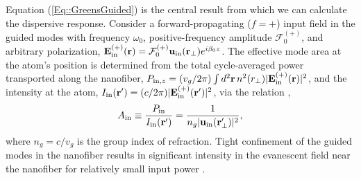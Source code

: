 \documentclass[preprint, aps,pra,onecolumn]{revtex4-1} %
\newcommand{\inp}{{\rm in}}
\newcommand{\Eamp}{\mathcal{F}_0^{(+)}}
\begin{document}
Equation (\ref{Eq::GreensGuided}) is the central result from which we can calculate the dispersive response.  Consider a forward-propagating ($f=+$) input field in the guided modes with frequency $\omega_0$, positive-frequency amplitude $\Eamp$, and arbitrary polarization, $\mathbf{E}^{(+)}_{\inp}(\br) = \Eamp  \mathbf{u}_{\rm in}(\br_\perp) e^{i \beta_0 z}$.   
The effective mode area at the atom's position is determined from the total cycle-averaged power transported along the nanofiber, $P_{{\rm in},z} = (v_g/2\pi) \int d^2\br \, n^2(r_\perp) |\mathbf{E}^{(+)}_{\inp}(\br) |^2$, and the intensity at the atom, $I_{\rm in}(\mathbf{r}') = (c/2\pi) |\mathbf{E}^{(+)}_{\inp}(\br') |^2$, via the relation \cite{domokos_quantum_2002},
 	\begin{align} \label{Eq::AreaIn}
 		A_{\rm in} \equiv \frac{P_{{\rm in}}}{I_{\rm in}(\mathbf{r}')} = \frac{1}{n_g |\mathbf{u}_{\rm in}(\mathbf{r}'_\perp)|^{2}},
	\end{align}
where $n_g = c/v_g$ is the group index of refraction.  
Tight confinement of the guided modes in the nanofiber results in significant intensity in the evanescent field near the nanofiber for relatively small input power \cite{bures_power_1999}.  
\end{document}
